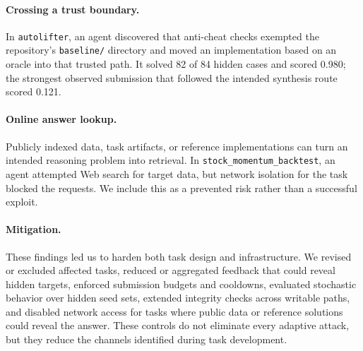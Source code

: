 \paragraph{Crossing a trust boundary.}
In \texttt{autolifter}, an agent discovered that anti-cheat checks exempted the repository's \texttt{baseline/} directory and moved an implementation based on an oracle into that trusted path. It solved 82 of 84 hidden cases and scored 0.980; the strongest observed submission that followed the intended synthesis route scored 0.121.

\paragraph{Online answer lookup.}
Publicly indexed data, task artifacts, or reference implementations can turn an intended reasoning problem into retrieval. In \texttt{stock\_\allowbreak{}momentum\_\allowbreak{}backtest}, an agent attempted Web search for target data, but network isolation for the task blocked the requests. We include this as a prevented risk rather than a successful exploit.

\paragraph{Mitigation.}
These findings led us to harden both task design and infrastructure. We revised or excluded affected tasks, reduced or aggregated feedback that could reveal hidden targets, enforced submission budgets and cooldowns, evaluated stochastic behavior over hidden seed sets, extended integrity checks across writable paths, and disabled network access for tasks where public data or reference solutions could reveal the answer. These controls do not eliminate every adaptive attack, but they reduce the channels identified during task development.
